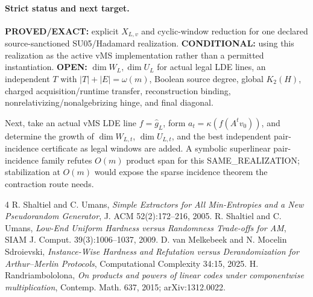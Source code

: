 \documentclass[11pt]{article}
\begin{document}
\paragraph{Strict status and next target.}
\textbf{PROVED/EXACT:} explicit \(X_{L,v}\) and cyclic-window reduction for one declared source-sanctioned SU05/Hadamard realization.
\textbf{CONDITIONAL:} using this realization as the active vMS implementation rather than a permitted instantiation.
\textbf{OPEN:} \(\dim W_L,\dim U_L\) for actual legal LDE lines, an independent \(T\) with \(|T|+|E|=\omega(m)\), Boolean source degree, global \(K_2(H)\), charged acquisition/runtime transfer, reconstruction binding, nonrelativizing/nonalgebrizing hinge, and final diagonal.

Next, take an actual vMS LDE line \(f=\widehat g_L\), form \(a_t=\kappa(f(A^tv_0))\), and determine the growth of \(\dim W_{L,t}\), \(\dim U_{L,t}\), and the best independent pair-incidence certificate as legal windows are added. A symbolic superlinear pair-incidence family refutes \(O(m)\) product span for this SAME_REALIZATION; stabilization at \(O(m)\) would expose the sparse incidence theorem the contraction route needs.

\begin{thebibliography}{4}
 R. Shaltiel and C. Umans, \emph{Simple Extractors for All Min-Entropies and a New Pseudorandom Generator}, J. ACM 52(2):172--216, 2005.
 R. Shaltiel and C. Umans, \emph{Low-End Uniform Hardness versus Randomness Trade-offs for AM}, SIAM J. Comput. 39(3):1006--1037, 2009.
 D. van Melkebeek and N. Mocelin Sdroievski, \emph{Instance-Wise Hardness and Refutation versus Derandomization for Arthur--Merlin Protocols}, Computational Complexity 34:15, 2025.
 H. Randriambololona, \emph{On products and powers of linear codes under componentwise multiplication}, Contemp. Math. 637, 2015; arXiv:1312.0022.
\end{thebibliography}
\end{document}
